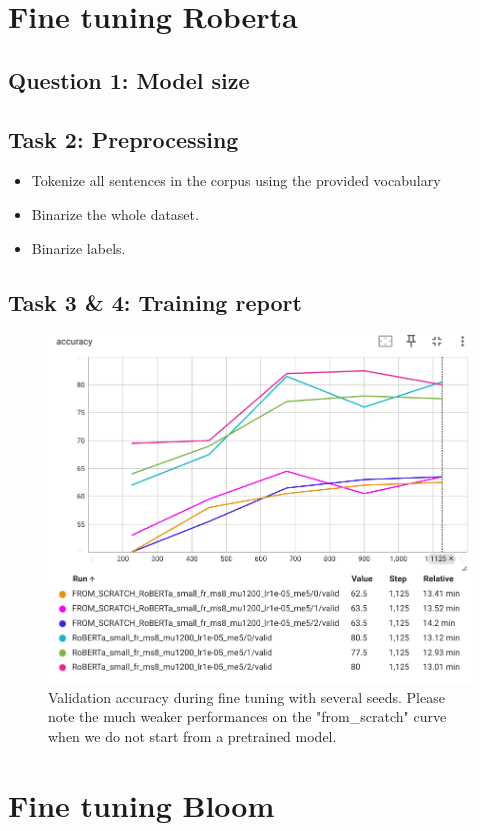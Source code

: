 \documentclass[a4paper]{article}
\begin{document}

\section{Fine tuning Roberta}
\subsection*{Question 1: Model size}

\subsection*{Task 2: Preprocessing}
\begin{itemize}
    \item Tokenize all sentences in the corpus using the provided vocabulary
    \item Binarize the whole dataset.
    \item Binarize labels.
\end{itemize}





\subsection*{Task 3 \& 4: Training report}


\begin{figure}[ht]
    \centering
    \includegraphics[width=.6\textwidth]{figures/training_roberta.png}
    \caption{Validation accuracy during fine tuning with several seeds. Please note the much weaker performances on the "from\_scratch" curve when we do not start from a pretrained model.}
    \label{fig:training_roberta}
\end{figure}



\section{Fine tuning Bloom}
\end{document}
